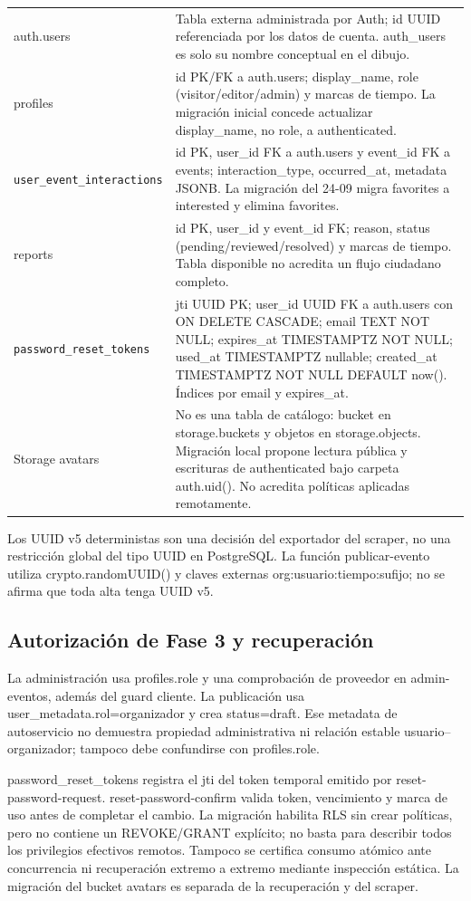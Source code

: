 \begin{longtable}{p{4.0cm}p{9.6cm}}
auth.users & Tabla externa administrada por Auth; id UUID referenciada por los datos de cuenta. auth\_users es solo su nombre conceptual en el dibujo. \\
profiles & id PK/FK a auth.users; display\_name, role (visitor/editor/admin) y marcas de tiempo. La migración inicial concede actualizar display\_name, no role, a authenticated. \\
\nolinkurl{user_event_interactions} & id PK, user\_id FK a auth.users y event\_id FK a events; interaction\_type, occurred\_at, metadata JSONB. La migración del 24-09 migra favorites a interested y elimina favorites. \\
reports & id PK, user\_id y event\_id FK; reason, status (pending/reviewed/resolved) y marcas de tiempo. Tabla disponible no acredita un flujo ciudadano completo. \\
\nolinkurl{password_reset_tokens} & jti UUID PK; user\_id UUID FK a auth.users con ON DELETE CASCADE; email TEXT NOT NULL; expires\_at TIMESTAMPTZ NOT NULL; used\_at TIMESTAMPTZ nullable; created\_at TIMESTAMPTZ NOT NULL DEFAULT now(). Índices por email y expires\_at. \\
Storage avatars & No es una tabla de catálogo: bucket en storage.buckets y objetos en storage.objects. Migración local propone lectura pública y escrituras de authenticated bajo carpeta auth.uid(). No acredita políticas aplicadas remotamente. \\
\bottomrule\end{longtable}
Los UUID v5 deterministas son una decisión del exportador del scraper, no una restricción
global del tipo UUID en PostgreSQL. La función publicar-evento utiliza crypto.randomUUID()
y claves externas org:usuario:tiempo:sufijo; no se afirma que toda alta tenga UUID v5.

\subsection{Autorización de Fase 3 y recuperación}
La administración usa profiles.role y una comprobación de proveedor en admin-eventos,
además del guard cliente. La publicación usa user\_metadata.rol=organizador y crea status=draft.
Ese metadata de autoservicio no demuestra propiedad administrativa ni relación estable
usuario--organizador; tampoco debe confundirse con profiles.role.

password\_reset\_tokens registra el jti del token temporal emitido por reset-password-request.
reset-password-confirm valida token, vencimiento y marca de uso antes de completar el cambio.
La migración habilita RLS sin crear políticas, pero no contiene un REVOKE/GRANT explícito;
no basta para describir todos los privilegios efectivos remotos. Tampoco se certifica
consumo atómico ante concurrencia ni recuperación extremo a extremo mediante inspección estática.
La migración del bucket avatars es separada de la recuperación y del scraper.

